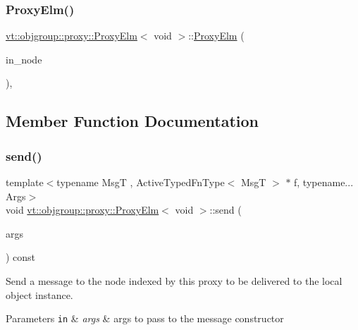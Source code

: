 \subsubsection{\texorpdfstring{Proxy\+Elm()}{ProxyElm()}}
{\footnotesize\ttfamily \hyperlink{structvt_1_1objgroup_1_1proxy_1_1_proxy_elm}{vt\+::objgroup\+::proxy\+::\+Proxy\+Elm}$<$ void $>$\+::\hyperlink{structvt_1_1objgroup_1_1proxy_1_1_proxy_elm}{Proxy\+Elm} (\begin{DoxyParamCaption}\item[{\hyperlink{namespacevt_a866da9d0efc19c0a1ce79e9e492f47e2}{Node\+Type}}]{in\+\_\+node }\end{DoxyParamCaption})\hspace{0.3cm}{\ttfamily [inline]}, {\ttfamily [explicit]}}



\subsection{Member Function Documentation}
\mbox{\label{structvt_1_1objgroup_1_1proxy_1_1_proxy_elm_3_01void_01_4_a823b06cf35e500b7a14f2eadb38c9e6d}} 
\subsubsection{\texorpdfstring{send()}{send()}}
{\footnotesize\ttfamily template$<$typename MsgT , Active\+Typed\+Fn\+Type$<$ Msg\+T $>$ $\ast$ f, typename... Args$>$ \\
void \hyperlink{structvt_1_1objgroup_1_1proxy_1_1_proxy_elm}{vt\+::objgroup\+::proxy\+::\+Proxy\+Elm}$<$ void $>$\+::send (\begin{DoxyParamCaption}\item[{Args \&\&...}]{args }\end{DoxyParamCaption}) const}



Send a message to the node indexed by this proxy to be delivered to the local object instance. 


\begin{DoxyParams}[1]{Parameters}
\mbox{\tt in}  & {\em args} & args to pass to the message constructor \\
\hline
\end{DoxyParams}


